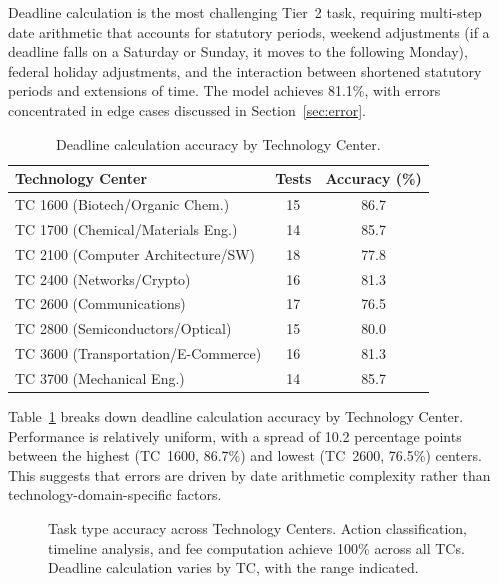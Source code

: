 \documentclass[11pt]{article}
\begin{document}
Deadline calculation is the most challenging Tier~2 task, requiring multi-step date arithmetic that accounts for statutory periods, weekend adjustments (if a deadline falls on a Saturday or Sunday, it moves to the following Monday), federal holiday adjustments, and the interaction between shortened statutory periods and extensions of time. The model achieves 81.1\%, with errors concentrated in edge cases discussed in Section~\ref{sec:error}.

\begin{table}[H]
\centering
\caption{Deadline calculation accuracy by Technology Center.}
\label{tab:deadline_by_tc}
\begin{tabular}{@{}lcc@{}}
\toprule
\textbf{Technology Center} & \textbf{Tests} & \textbf{Accuracy (\%)} \\
\midrule
TC 1600 (Biotech/Organic Chem.) & 15 & 86.7 \\
TC 1700 (Chemical/Materials Eng.) & 14 & 85.7 \\
TC 2100 (Computer Architecture/SW) & 18 & 77.8 \\
TC 2400 (Networks/Crypto) & 16 & 81.3 \\
TC 2600 (Communications) & 17 & 76.5 \\
TC 2800 (Semiconductors/Optical) & 15 & 80.0 \\
TC 3600 (Transportation/E-Commerce) & 16 & 81.3 \\
TC 3700 (Mechanical Eng.) & 14 & 85.7 \\
\bottomrule
\end{tabular}
\end{table}

Table~\ref{tab:deadline_by_tc} breaks down deadline calculation accuracy by Technology Center. Performance is relatively uniform, with a spread of 10.2 percentage points between the highest (TC~1600, 86.7\%) and lowest (TC~2600, 76.5\%) centers. This suggests that errors are driven by date arithmetic complexity rather than technology-domain-specific factors.

\begin{figure}[H]
\centering
{}
\caption{Task type accuracy across Technology Centers. Action classification, timeline analysis, and fee computation achieve 100\% across all TCs. Deadline calculation varies by TC, with the range indicated.}
\label{fig:tc_accuracy}
\end{figure}
\end{document}
